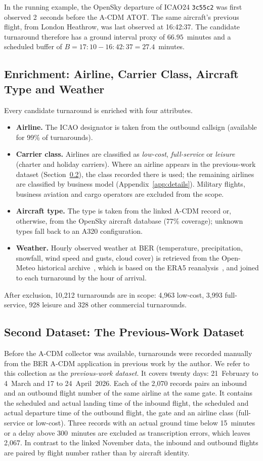 In the running example, the OpenSky departure of ICAO24 \texttt{3c55c2} was first observed 2~seconds before the A-CDM ATOT. The same aircraft's previous flight, from London Heathrow, was last observed at 16:42:37. The candidate turnaround therefore has a ground interval proxy of $66.95$~minutes and a scheduled buffer of $B=17{:}10-16{:}42{:}37=27.4$~minutes.

\subsection{Enrichment: Airline, Carrier Class, Aircraft Type and Weather}
Every candidate turnaround is enriched with four attributes.
\begin{itemize}
\item \textbf{Airline.} The ICAO designator is taken from the outbound callsign (available for 99\% of turnarounds).
\item \textbf{Carrier class.} Airlines are classified as \emph{low-cost}, \emph{full-service} or \emph{leisure} (charter and holiday carriers). Where an airline appears in the previous-work dataset (Section~\ref{sec:method-febapr}), the class recorded there is used; the remaining airlines are classified by business model (Appendix~\ref{app:details}). Military flights, business aviation and cargo operators are excluded from the scope.
\item \textbf{Aircraft type.} The type is taken from the linked A-CDM record or, otherwise, from the OpenSky aircraft database (77\% coverage); unknown types fall back to an A320 configuration.
\item \textbf{Weather.} Hourly observed weather at BER (temperature, precipitation, snowfall, wind speed and gusts, cloud cover) is retrieved from the Open-Meteo historical archive~\cite{openmeteo}, which is based on the ERA5 reanalysis~\cite{hersbach2020era5}, and joined to each turnaround by the hour of arrival.
\end{itemize}
After exclusion, 10,212 turnarounds are in scope: 4,963 low-cost, 3,993 full-service, 928 leisure and 328 other commercial turnarounds.

\subsection{Second Dataset: The Previous-Work Dataset}
\label{sec:method-febapr}
Before the A-CDM collector was available, turnarounds were recorded manually from the BER A-CDM application in previous work by the author. We refer to this collection as the \emph{previous-work dataset}. It covers twenty days: 21~February to 4~March and 17 to 24~April~2026. Each of the 2,070 records pairs an inbound and an outbound flight number of the same airline at the same gate. It contains the scheduled and actual landing time of the inbound flight, the scheduled and actual departure time of the outbound flight, the gate and an airline class (full-service or low-cost). Three records with an actual ground time below 15~minutes or a delay above 300~minutes are excluded as transcription errors, which leaves 2,067. In contrast to the linked November data, the inbound and outbound flights are paired by flight number rather than by aircraft identity.

